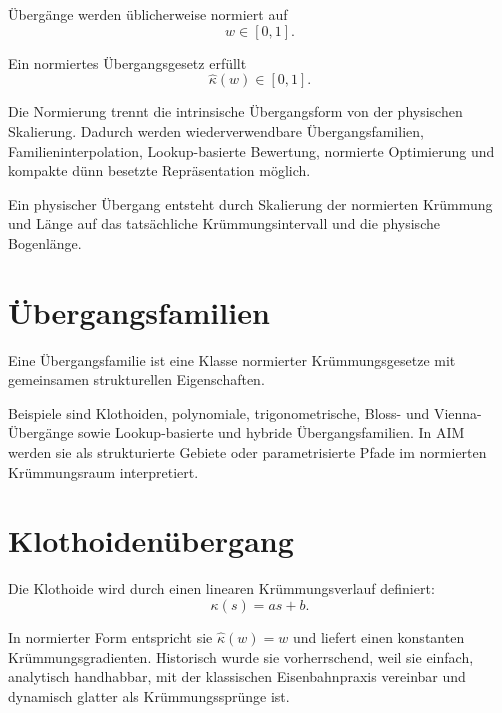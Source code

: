 \begin{definition}
\label{def:normalized-transition-parameter}
Übergänge werden üblicherweise normiert auf
\[
w\in[0,1].
\]
\end{definition}

\begin{definition}
\label{def:normalized-transition-law}
Ein normiertes Übergangsgesetz erfüllt
\[
\hat\kappa(w)\in[0,1].
\]
\end{definition}

Die Normierung trennt die intrinsische Übergangsform von der physischen
Skalierung. Dadurch werden wiederverwendbare Übergangsfamilien,
Familieninterpolation, Lookup-basierte Bewertung, normierte Optimierung und
kompakte dünn besetzte Repräsentation möglich.

Ein physischer Übergang entsteht durch Skalierung der normierten Krümmung und
Länge auf das tatsächliche Krümmungsintervall und die physische Bogenlänge.

\section{Übergangsfamilien}

\begin{definition}[Übergangsfamilie]
\label{def:transition-family}
Eine Übergangsfamilie ist eine Klasse normierter Krümmungsgesetze mit
gemeinsamen strukturellen Eigenschaften.
\end{definition}

Beispiele sind Klothoiden, polynomiale, trigonometrische, Bloss- und
Vienna-Übergänge sowie Lookup-basierte und hybride Übergangsfamilien. In AIM
werden sie als strukturierte Gebiete oder parametrisierte Pfade im normierten
Krümmungsraum interpretiert.

\section{Klothoidenübergang}

\begin{definition}[Klothoide]
\label{def:clothoid-transition}
Die Klothoide wird durch einen linearen Krümmungsverlauf definiert:
\[
\kappa(s)=a s+b.
\]
\end{definition}

In normierter Form entspricht sie \(\hat\kappa(w)=w\) und liefert einen
konstanten Krümmungsgradienten. Historisch wurde sie vorherrschend, weil sie
einfach, analytisch handhabbar, mit der klassischen Eisenbahnpraxis vereinbar
und dynamisch glatter als Krümmungssprünge ist.

